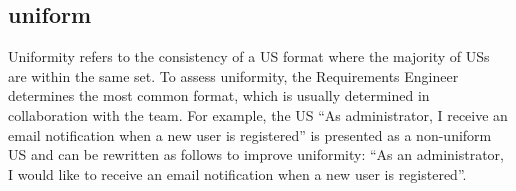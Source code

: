 \subsection*{\normalsize{uniform}}
Uniformity refers to the consistency of a US format where the majority of USs are within the same set. To assess uniformity, the Requirements Engineer determines the most common format, which is usually determined in collaboration with the team. For example, the US \enquote{As administrator, I receive an email notification when a new user is registered} is presented as a non-uniform US and can be rewritten as follows to improve uniformity: \enquote{As an administrator, I would like to receive an email notification when a new user is registered}.

